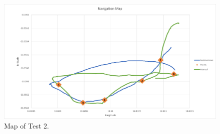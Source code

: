 \begin{figure}[hb]
	\begin{center}
		\includegraphics[height=0.8\linewidth, angle = 270]{figures/graphMap2.jpg}
		\caption{Map of Test 2.}
		\label{graph:4:Map2}
	\end{center}
\end{figure} 